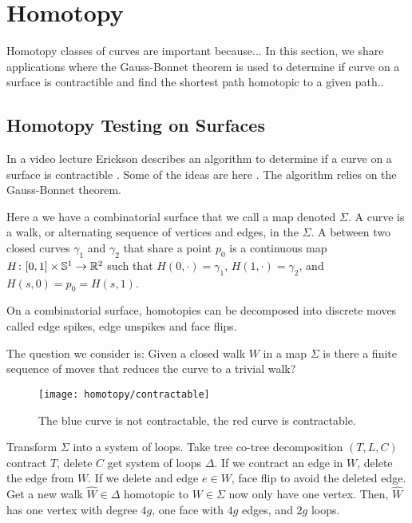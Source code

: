\section{Homotopy}
\label{sec:homotopy}

Homotopy classes of curves are important  because...
In this section, we share applications
where the Gauss-Bonnet theorem is used to determine
if curve on a surface is contractible and find
the shortest path homotopic to a given path..


\subsection{Homotopy Testing on Surfaces}

In a video lecture Erickson describes an algorithm
to determine if a curve on a surface is contractible \cite{erickson-lecture}.
Some of the ideas are here \cite{gertsen-short-1990}.
The algorithm relies on the Gauss-Bonnet theorem.

Here a we have a combinatorial surface that we call a map denoted $\Sigma.$
A curve is a walk, or alternating sequence of vertices
and edges, in the $\Sigma$.
A  between two closed curves $\gamma_1$ and $\gamma_2$ that 
share a point $p_0$ is a continuous map $H\colon [0,1]\times \mathbb{S}^1 \to \mathbb{R}^2$ 
such that $H(0,\cdot)=\gamma_1$, $H(1,\cdot)=\gamma_2$, and $H(s,0)=p_0=H(s,1)$.

On a combinatorial surface, homotopies can be decomposed
into discrete moves called edge spikes, edge unspikes  and face flips.

The question we consider is: Given a closed walk $W$ in a map $\Sigma$ is there a finite
sequence of moves that reduces the curve to a trivial walk?

\begin{figure}[htb]
\centering
\texttt{[image: homotopy/contractable]}
\caption{The blue curve is not contractable, the red curve is contractable.}
\label{fig:contractable}
\end{figure}

Transform $\Sigma$ into a system of loops.  
Take tree co-tree decomposition $(T,L,C)$
contract $T$, delete $C$ get system of loops $\Delta$.
If we contract an edge in $W$, delete the edge from $W$.
If we delete and edge $e\in W$, face flip to avoid the deleted edge.
Get a new walk $\hat{W} \in \Delta$ homotopic to $W\in \Sigma$
now only have one vertex. Then, $\hat{W}$ has one vertex
with degree $4g$, one face with $4g$ edges, and $2g$ loops.

